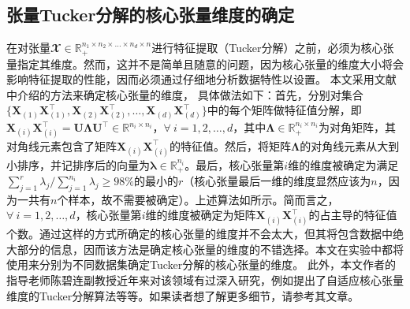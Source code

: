 \subsection{张量Tucker分解的核心张量维度的确定}
在对张量$\mathbfcal{X} \in \mathbb{R}_{+}^{n_1 \times n_2 \times \ldots \times n_d \times n}$进行特征提取（Tucker分解）之前，必须为核心张量指定其维度。然而，这并不是简单且随意的问题，因为核心张量的维度大小将会影响特征提取的性能，因而必须通过仔细地分析数据特性以设置。
本文采用文献中介绍的方法来确定核心张量的维度，
具体做法如下：首先，分别对集合$\{\boldsymbol{X}_{(1)}\boldsymbol{X}_{(1)}^{\top},\boldsymbol{X}_{(2)}\boldsymbol{X}_{(2)}^{\top},\ldots,\allowbreak\boldsymbol{X}_{(d)}\boldsymbol{X}_{(d)}^{\top}\}$中的每个矩阵做特征值分解，即$\boldsymbol{X}_{(i)}\boldsymbol{X}_{(i)}^{\top} = \boldsymbol{U}\boldsymbol{\Lambda} \boldsymbol{U}^{\top}\in\mathbb{R}^{n_i \times n_i}$，$\forall~i=1,2,\ldots,d$，其中$\boldsymbol{\Lambda}\in \mathbb{R}_{+}^{n_i \times n_i}$为对角矩阵，其对角线元素包含了矩阵$\boldsymbol{X}_{(i)}\boldsymbol{X}_{(i)}^{\top}$的特征值。然后，将矩阵$\boldsymbol{\Lambda}$的对角线元素从大到小排序，并记排序后的向量为$\boldsymbol{\lambda} \in \mathbb{R}_{+}^{n_i}$。最后，核心张量第$i$维的维度被确定为满足$\sum_{j=1}^{r} \lambda_j/\sum_{j=1}^{n_i} \lambda_j \ge 98\%$的最小的$r$（核心张量最后一维的维度显然应该为$n$，因为一共有$n$个样本，故不需要被确定）。上述算法如所示。简而言之，$\forall~i=1,2,\ldots,d$，核心张量第$i$维的维度被确定为矩阵$\boldsymbol{X}_{(i)}\boldsymbol{X}_{(i)}^{\top}$的占主导的特征值个数。通过这样的方式所确定的核心张量的维度并不会太大，但其将包含数据中绝大部分的信息，因而该方法是确定核心张量的维度的不错选择。本文在实验中都将使用来分别为不同数据集确定Tucker分解的核心张量的维度。
此外，本文作者的指导老师陈碧连副教授近年来对该领域有过深入研究，例如提出了自适应核心张量维度的Tucker分解算法等等。如果读者想了解更多细节，请参考其文章。

